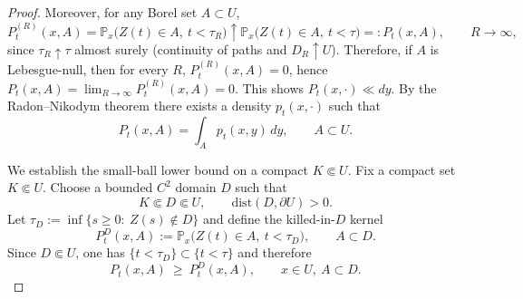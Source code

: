 \documentclass[pdflatex,sn-mathphys-ay]{sn-jnl}
\theoremstyle{thmstyleone}
\theoremstyle{definition}
\theoremstyle{remark}
\begin{document}
\begin{appendices}
\begin{proof}
Moreover, for any Borel set $A\subset U$,
\[
P_t^{(R)}(x,A)=\mathbb P_x\bigl(Z(t)\in A,\ t<\tau_R\bigr)
\uparrow
\mathbb P_x\bigl(Z(t)\in A,\ t<\tau\bigr)
=:P_t(x,A),
\qquad R\to\infty,
\]
since $\tau_R\uparrow\tau$ almost surely (continuity of paths and $D_R\uparrow U$).
Therefore, if $A$ is Lebesgue-null, then for every $R$,
$P_t^{(R)}(x,A)=0$, hence $P_t(x,A)=\lim_{R\to\infty}P_t^{(R)}(x,A)=0$.
This shows $P_t(x,\cdot)\ll dy$. By the Radon--Nikodym theorem there exists a density $p_t(x,\cdot)$ such that
\[
P_t(x,A)=\int_A p_t(x,y)\,dy,\qquad A\subset U.
\]

We establish the small-ball lower bound on a compact $K\Subset U$.
Fix a compact set $K\Subset U$. Choose a bounded $C^2$ domain $D$ such that
\[
K\Subset D\Subset U,
\qquad
\mathrm{dist}(D,\partial U)>0.
\]
Let $\tau_D:=\inf\{s\ge0:\ Z(s)\notin D\}$ and define the killed-in-$D$ kernel
\[
P_t^{D}(x,A):=\mathbb P_x\bigl(Z(t)\in A,\ t<\tau_D\bigr),\qquad A\subset D.
\]
Since $D\Subset U$, one has $\{t<\tau_D\}\subset\{t<\tau\}$ and therefore
\begin{equation}\label{eq:Pt_dominates_PtD}
P_t(x,A)\ \ge\ P_t^D(x,A),\qquad x\in U,\ A\subset D.
\end{equation}


\end{proof}
\end{appendices}
\end{document}
